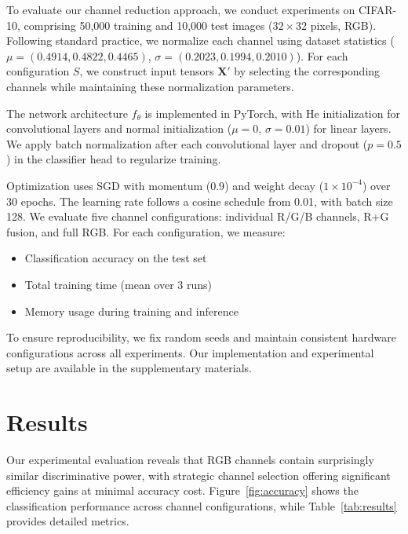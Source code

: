 \documentclass{article} %
\begin{document}
To evaluate our channel reduction approach, we conduct experiments on CIFAR-10, comprising 50,000 training and 10,000 test images ($32\times32$ pixels, RGB). Following standard practice, we normalize each channel using dataset statistics ($\mu=(0.4914, 0.4822, 0.4465)$, $\sigma=(0.2023, 0.1994, 0.2010)$). For each configuration $S$, we construct input tensors $\mathbf{X'}$ by selecting the corresponding channels while maintaining these normalization parameters.

The network architecture $f_\theta$ is implemented in PyTorch, with He initialization for convolutional layers and normal initialization ($\mu=0$, $\sigma=0.01$) for linear layers. We apply batch normalization after each convolutional layer and dropout ($p=0.5$) in the classifier head to regularize training.

Optimization uses SGD with momentum ($0.9$) and weight decay ($1\times10^{-4}$) over 30 epochs. The learning rate follows a cosine schedule from 0.01, with batch size 128. We evaluate five channel configurations: individual R/G/B channels, R+G fusion, and full RGB. For each configuration, we measure:
\begin{itemize}
    \item Classification accuracy on the test set
    \item Total training time (mean over 3 runs)
    \item Memory usage during training and inference
\end{itemize}

To ensure reproducibility, we fix random seeds and maintain consistent hardware configurations across all experiments. Our implementation and experimental setup are available in the supplementary materials.

\section{Results}
\label{sec:results}

Our experimental evaluation reveals that RGB channels contain surprisingly similar discriminative power, with strategic channel selection offering significant efficiency gains at minimal accuracy cost. Figure~\ref{fig:accuracy} shows the classification performance across channel configurations, while Table~\ref{tab:results} provides detailed metrics.
\end{document}
